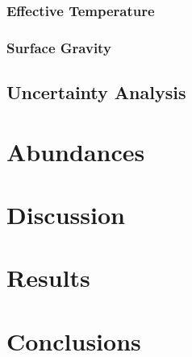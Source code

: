 \documentclass{emulateapj}
\begin{document}
\subsubsection{Effective Temperature}

\subsubsection{Surface Gravity}

\subsection{Uncertainty Analysis}


\section{Abundances}


\section{Discussion}

\section{Results}

\section{Conclusions}
\end{document}
